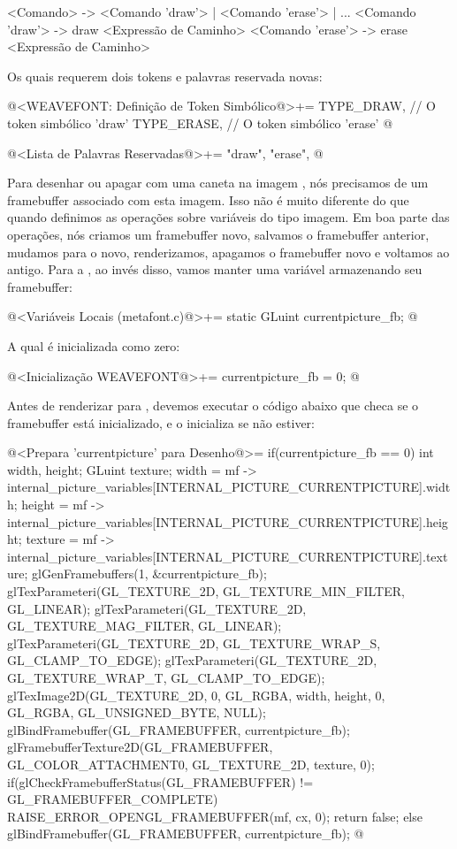 {{{{{{\alinhaverbatim
<Comando> -> <Comando 'draw'> | <Comando 'erase'> | ...
<Comando 'draw'> -> draw <Expressão de Caminho>
<Comando 'erase'> -> erase <Expressão de Caminho>
\alinhanormal

Os quais requerem dois tokens e palavras reservada novas:

\iniciocodigo
@<WEAVEFONT: Definição de Token Simbólico@>+=
TYPE_DRAW,   // O token simbólico 'draw'
TYPE_ERASE,  // O token simbólico 'erase'
@
\fimcodigo

\iniciocodigo
@<Lista de Palavras Reservadas@>+=
"draw", "erase",
@
\fimcodigo


Para desenhar ou apagar com uma caneta na
imagem , nós precisamos de um framebuffer
associado com esta imagem. Isso não é muito diferente do que quando
definimos as operações sobre variáveis do tipo imagem. Em boa parte
das operações, nós criamos um framebuffer novo, salvamos o framebuffer
anterior, mudamos para o novo, renderizamos, apagamos o framebuffer
novo e voltamos ao antigo. Para a , ao
invés disso, vamos manter uma variável armazenando seu framebuffer:

\iniciocodigo
@<Variáveis Locais (metafont.c)@>+=
static GLuint currentpicture_fb;
@
\fimcodigo

A qual é inicializada como zero:

\iniciocodigo
@<Inicialização WEAVEFONT@>+=
currentpicture_fb = 0;
@
\fimcodigo

Antes de renderizar para , devemos executar
o código abaixo que checa se o framebuffer está inicializado, e o
inicializa se não estiver:

\iniciocodigo
@<Prepara 'currentpicture' para Desenho@>=
{
  if(currentpicture_fb == 0){
    int width, height;
    GLuint texture;
    width = mf ->
             internal_picture_variables[INTERNAL_PICTURE_CURRENTPICTURE].width;
    height = mf ->
            internal_picture_variables[INTERNAL_PICTURE_CURRENTPICTURE].height;
    texture = mf ->
           internal_picture_variables[INTERNAL_PICTURE_CURRENTPICTURE].texture;
    glGenFramebuffers(1, &currentpicture_fb);
    glTexParameteri(GL_TEXTURE_2D, GL_TEXTURE_MIN_FILTER, GL_LINEAR);
    glTexParameteri(GL_TEXTURE_2D, GL_TEXTURE_MAG_FILTER, GL_LINEAR);
    glTexParameteri(GL_TEXTURE_2D, GL_TEXTURE_WRAP_S, GL_CLAMP_TO_EDGE);
    glTexParameteri(GL_TEXTURE_2D, GL_TEXTURE_WRAP_T, GL_CLAMP_TO_EDGE);
    glTexImage2D(GL_TEXTURE_2D, 0, GL_RGBA, width, height, 0, GL_RGBA,
                 GL_UNSIGNED_BYTE, NULL);
    glBindFramebuffer(GL_FRAMEBUFFER, currentpicture_fb);
    glFramebufferTexture2D(GL_FRAMEBUFFER, GL_COLOR_ATTACHMENT0, GL_TEXTURE_2D,
                           texture, 0);
    if(glCheckFramebufferStatus(GL_FRAMEBUFFER) != GL_FRAMEBUFFER_COMPLETE){
      RAISE_ERROR_OPENGL_FRAMEBUFFER(mf, cx, 0);
      return false;
    }
  }
  else
    glBindFramebuffer(GL_FRAMEBUFFER, currentpicture_fb);
}
@
\fimcodigo

}}}}}}
